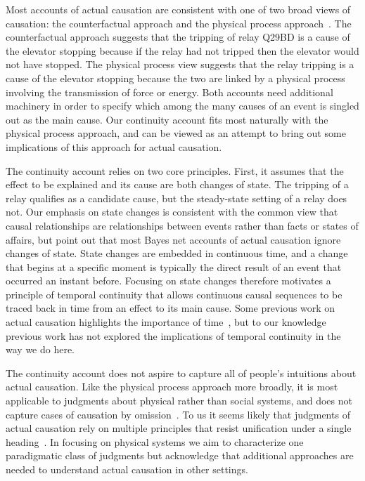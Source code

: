 \documentclass[10pt,letterpaper]{article}
\begin{document}
Most accounts of actual causation are consistent with one of two broad views of causation: the counterfactual approach and the physical process approach~\cite{hall04}. The counterfactual approach suggests that the tripping of relay Q29BD is a cause of the elevator stopping because if the relay had not tripped then the elevator would not have stopped. The physical process view suggests that the relay tripping is a cause of the elevator stopping because the two are linked by a physical process involving the transmission of force or energy.  Both accounts need additional machinery in order to specify which among the many causes of an event is singled out as the main cause. Our continuity account fits most naturally with the physical process approach, and can be viewed as an attempt to bring out some implications of this approach for actual causation. 

The continuity account relies on two core principles. First, it assumes that the effect to be explained and its cause are both changes of state. The tripping of a relay qualifies as a candidate cause, but the steady-state setting of a relay does not. Our emphasis on state changes is consistent with the common view that causal relationships are relationships between events rather than facts or states of affairs, but   point out that most Bayes net accounts of actual causation ignore changes of state. State changes are embedded in continuous time, and a change that begins at a specific moment is typically the direct result of an event that occurred an instant before. Focusing on state changes therefore motivates a principle of temporal continuity that allows continuous causal sequences to be traced back in time from an effect to its main cause. Some previous work on actual causation highlights the importance of time~\cite{youngs09,stephanmw20e}, but to our knowledge previous work has not explored the implications of temporal continuity in the way we do here.

The continuity account does not aspire to capture all of people's intuitions about actual causation. Like the physical process approach more broadly, it is most applicable to judgments about physical rather than social systems, and does not capture cases of causation by omission~\cite{wolffbh10}. To us it seems likely that judgments of actual causation rely on multiple principles that resist unification under a single heading~\cite{hall04,danks17}. In focusing on physical systems we aim to characterize one paradigmatic class of judgments but acknowledge that additional approaches are needed to understand actual causation in other settings.
\end{document}
